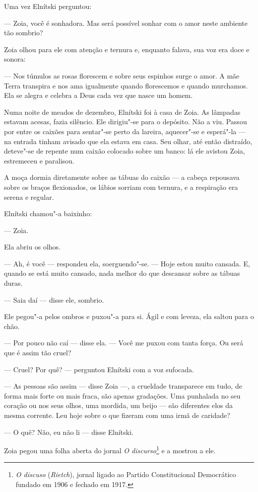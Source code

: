 Uma vez Elnítski perguntou:

--- Zoia, você é sonhadora. Mas será possível sonhar com o amor neste
ambiente tão sombrio?

Zoia olhou para ele com atenção e ternura e, enquanto falava, sua voz
era doce e sonora:

--- Nos túmulos as rosas florescem e sobre seus espinhos surge o amor. A
mãe Terra transpira e nos ama igualmente quando florescemos e quando
murchamos. Ela se alegra e celebra a Deus cada vez que nasce um homem.

Numa noite de meados de dezembro, Elnítski foi à casa de Zoia. As
lâmpadas estavam acesas, fazia silêncio. Ele dirigiu"-se para o depósito.
Não a viu. Passou por entre os caixões para sentar"-se perto da
lareira, aquecer"-se e esperá"-la --- na entrada tinham avisado que ela
estava em casa. Seu olhar, até então distraído, deteve"-se de repente num
caixão colocado sobre um banco: lá ele avistou Zoia, estremeceu e
paralisou.

A moça dormia diretamente sobre as tábuas do caixão --- a cabeça
repousava sobre os braços flexionados, os lábios sorriam com ternura, e
a respiração era serena e regular.

Elnítski chamou"-a baixinho:

--- Zoia.

Ela abriu os olhos.

--- Ah, é você --- respondeu ela, soerguendo"-se. --- Hoje estou muito
cansada. E, quando se está muito cansado, nada melhor do que descansar
sobre as tábuas duras.

--- Saia daí --- disse ele, sombrio.

Ele pegou"-a pelos ombros e puxou"-a para si. Ágil e com leveza, ela
saltou para o chão.

--- Por pouco não caí --- disse ela. --- Você me puxou com tanta força.
Ou será que é assim tão cruel?

--- Cruel? Por quê? --- perguntou Elnítski com a voz sufocada.

--- As pessoas são assim --- disse Zoia ---, a crueldade transparece em
tudo, de forma mais forte ou mais fraca, são apenas gradações. Uma
punhalada no seu coração ou nos seus olhos, uma mordida, um beijo ---
são diferentes elos da mesma corrente. Leu hoje sobre o que fizeram com
uma irmã de caridade?

--- O quê? Não, eu não li --- disse Elnítski.

Zoia pegou uma folha aberta do jornal \emph{O discurso}\footnote{\emph{O
  discuso} (\emph{Rietch}), jornal ligado ao Partido Constitucional
  Democrático fundado em 1906 e fechado em 1917.} e a mostrou a ele.

